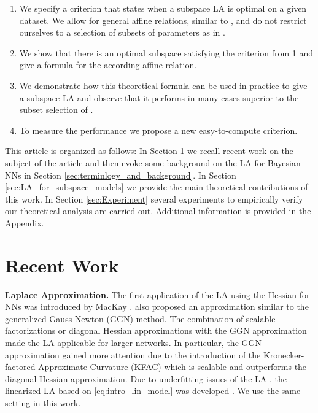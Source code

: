 \begin{enumerate}
    \item We specify a criterion that states when a subspace LA is optimal on a given dataset. We allow for general affine relations, similar to \cite{Izmailov2019}, and do not restrict ourselves to a selection of subsets of parameters as in \cite{Daxberger2021}.
    \item We show that there is an optimal subspace satisfying the criterion from 1 and give a formula for the according affine relation. 
    \item We demonstrate how this theoretical formula can be used in practice to give a subspace LA and observe that it performs in many cases superior to the subset selection of \cite{Daxberger2021,LaplaceRedux2021}.
    \item To measure the performance we propose a new easy-to-compute criterion.
\end{enumerate}

This article is organized as follows: In Section \ref{sec:recent_work} we recall recent work on the subject of the article and then evoke some background on the LA for Bayesian NNs in Section \ref{sec:terminlogy_and_background}. In Section \ref{sec:LA_for_subspace_models} we provide the main theoretical contributions of this work. In Section \ref{sec:Experiment} several experiments to empirically verify our theoretical analysis are carried out. Additional information is provided in the Appendix.

\section{Recent Work}
\label{sec:recent_work}

\textbf{Laplace Approximation.} The first application of the LA using the Hessian for NNs was introduced by MacKay \cite{MacKay1992}. \cite{MacKay1992Class} also proposed an approximation similar to the generalized Gauss-Newton (GGN) method. The combination of scalable factorizations or diagonal Hessian approximations with the GGN approximation \cite{Schraudolph2002,Martens14} made the LA applicable for larger networks. In particular, the GGN approximation  gained more attention due to 
the introduction of the Kronecker-factored Approximate Curvature (KFAC) \cite{Ritter2018,Botev2017,Martens2015} which is scalable and outperforms the diagonal Hessian approximation.
Due to underfitting issues of the LA \cite{Foong2019}, the linearized
LA based on \eqref{eq:intro_lin_model} was developed \cite{Immer2021}. We use the same setting in
this work.


